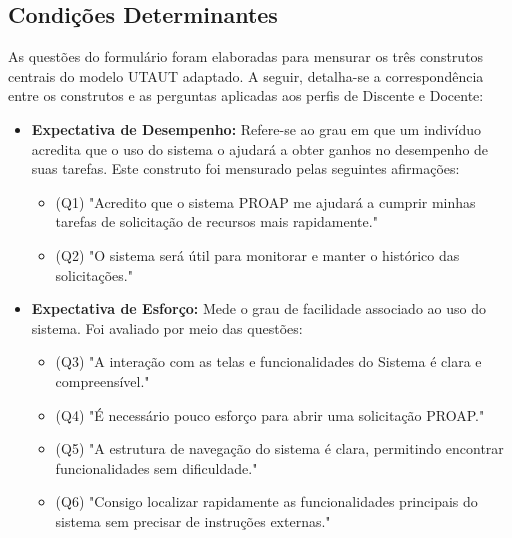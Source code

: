 \documentclass[portuguese]{sbc2025}%
\begin{document}
\subsection{Condições Determinantes}

As questões do formulário foram elaboradas para mensurar os três construtos centrais do modelo UTAUT adaptado. A seguir, detalha-se a correspondência entre os construtos e as perguntas aplicadas aos perfis de Discente e Docente:

\begin{itemize}
    \item \textbf{Expectativa de Desempenho:} Refere-se ao grau em que um indivíduo acredita que o uso do sistema o ajudará a obter ganhos no desempenho de suas tarefas. Este construto foi mensurado pelas seguintes afirmações:
    \begin{itemize}
        \item (Q1) "Acredito que o sistema PROAP me ajudará a cumprir minhas tarefas de solicitação de recursos mais rapidamente."
        \item (Q2) "O sistema será útil para monitorar e manter o histórico das solicitações." 
    \end{itemize}

    \item \textbf{Expectativa de Esforço:} Mede o grau de facilidade associado ao uso do sistema. Foi avaliado por meio das questões:
    \begin{itemize}
        \item (Q3) "A interação com as telas e funcionalidades do Sistema é clara e compreensível." 
        \item (Q4) "É necessário pouco esforço para abrir uma solicitação PROAP." 
        \item (Q5) "A estrutura de navegação do sistema é clara, permitindo encontrar funcionalidades sem dificuldade." 
        \item (Q6) "Consigo localizar rapidamente as funcionalidades principais do sistema sem precisar de instruções externas." 
    \end{itemize}


\end{itemize}
\end{document}
